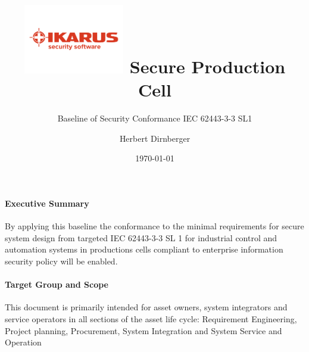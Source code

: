 \documentclass[a4paper, 11pt]{scrartcl}
\title{
\vspace{-3cm}
\hspace{10cm}
\includegraphics[width=0.33\textwidth]{img/ikarus_logo.png}
Secure Production Cell}
\subtitle{Baseline of Security Conformance IEC 62443-3-3 SL1}
\author{Herbert Dirnberger}
\date{\today}
\begin{document}

\maketitle


\setlength{\parindent}{0pt} 

\paragraph{Executive Summary}
By applying this baseline the conformance to the minimal requirements for secure system design from targeted IEC 62443-3-3 SL 1 for industrial control and automation systems in productions cells compliant to enterprise information security policy will be enabled.

\paragraph{Target Group and Scope}
This document is primarily intended for asset owners, system integrators and service operators in all sections of the asset life cycle: Requirement Engineering, Project planning, Procurement, System Integration and System Service and Operation



\newpage
\tableofcontents





\newpage
{}
\newpage
%
%
\end{document}
